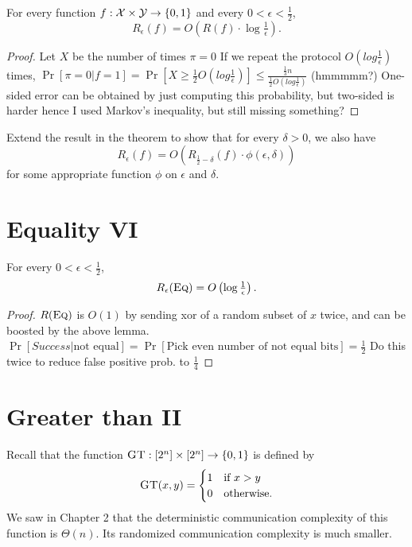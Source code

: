\begin{theorem}
For every function $f : \mathcal{X} \times \mathcal{Y} \to \{0,1\}$ and every $0 < \epsilon < \frac12$, 
\[
R_\epsilon(f) = O\left( R(f) \cdot \log \tfrac1\epsilon \right).
\]
\end{theorem}

\begin{proof}
Let $X$ be the number of times $\pi = 0$
If we repeat the protocol $O(log\frac{1}{\epsilon})$ times, 
$\Pr[\pi = 0 | f = 1 ] = \Pr[X \ge \frac{1}{2}O(log\frac{1}{\epsilon})] \le \frac{\frac{1}{3}n}{\frac{1}{2}O(log\frac{1}{\epsilon})}$ (hmmmmm?)
One-sided error can be obtained by just computing this probability, but two-sided is harder hence I used Markov's inequality, but still missing something?
\end{proof}

\exercises

\begin{exercise}
Extend the result in the theorem to show that for every $\delta > 0$, we also have
\[
R_\epsilon(f) = O\left( R_{\frac12 - \delta}(f) \cdot \phi(\epsilon,\delta) \right)
\]
for some appropriate function $\phi$ on $\epsilon$ and $\delta$.
\end{exercise}


\newpage 
\section{Equality VI}


\begin{theorem}
For every $0 < \epsilon < \frac12$,
\[
R_\epsilon(\textsc{Eq}) = O\left(\log \tfrac1\epsilon \right).
\]
\end{theorem}

\begin{proof}
$R(\textsc{Eq})$ is $O(1)$ by sending xor of a random subset of $x$ twice, and can be boosted by the above lemma.   
$\Pr[Success | \text{not equal}] = \Pr[\text{Pick even number of not equal bits}] = \frac{1}{2}$
Do this twice to reduce false positive prob. to $\frac{1}{4}$
\end{proof}


\newpage 
\section{Greater than II}

Recall that the function $\textsc{GT} : [2^n] \times [2^n] \to \{0,1\}$ is defined by
\[
\textsc{GT}(x,y) = \begin{cases}
1 & \mbox{if } x > y \\
0 & \mbox{otherwise.}
\end{cases}
\]
We saw in Chapter 2 that the deterministic communication complexity of this function is $\Theta(n)$. Its randomized communication complexity is much smaller.

